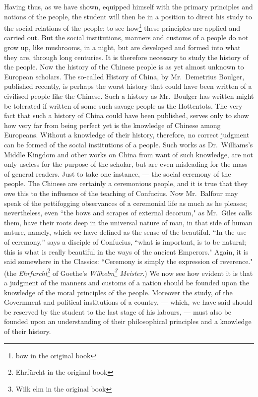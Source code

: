 Having thus, as we have shown, equipped himself with the primary principles and notions of the people, the student will then be in a position to direct his study to the social relations of the people; to see how\footnote{bow in the original book} these principles are applied and carried out. 
But the social institutions, manners and customs of a people do not grow up, like mushrooms, in a night, but are developed and formed into what they are, through long centuries.
It is therefore necessary to study the history of the people.
Now the history of the Chinese people is as yet almost unknown to European scholars.
The so-called History of China, by Mr.~Demetrius Boulger, published recently, is perhaps the worst history that could have been written of a civilised people like the Chinese.
Such a history as Mr.~Boulger has written might be tolerated if written of some such savage people as the Hottentots. 
The very fact that such a history of China could have been published, serves only to show how very far from being perfect yet is the knowledge of Chinese among Europeans.
Without a knowledge of their history, therefore, no correct judgment can be formed of the social institutions of a people.
Such works as Dr.~Williams's Middle Kingdom and other works on China from want of such knowledge, are not only useless for the purpose of the scholar, but are even misleading for the mass of general readers.
Just to take one instance, --- the social ceremony of the people.
The Chinese are certainly a ceremonious people, and it is true that they owe this to the influence of the teaching of Confucius.
Now Mr.~Balfour may speak of the pettifogging observances of a ceremonial life as much as he pleases; nevertheless, even ``the bows and scrapes  of external decorum," as Mr.~Giles calls them, have their roots deep in the universal nature of man, in that side of human nature, namely, which we have defined as the sense of the beautiful.
``In the use of ceremony,'' says a disciple of Confucius, ``what is important, is to be natural; this is what is really beautiful in the ways of the ancient Emperors."
Again, it is said somewhere in the Classics: ``Ceremony is simply the expression of reverence." (the \emph{Ehrfurcht}\footnote{Ehrf\"urcht in the original book} of Goethe's \emph{Wilhelm\footnote{Wilk elm in the original book} Meister}.)
We now see how evident it is that a judgment of the manners and customs of a nation should be founded upon the knowledge of the moral principles of the people.
Moreover the study, of the Government and political institutions of a country, --- which, we have said should be reserved by the student to the last stage of his labours, --- must also be founded upon an understanding of their philosophical principles and a knowledge of their history.

